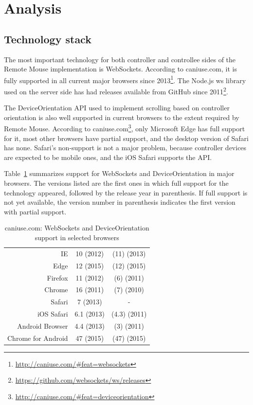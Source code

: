 \documentclass[a4paper,english,twocolumn,9pt]{extarticle}
\newcommand*\rot{\rotatebox{90}}
\begin{document}
\section{Analysis}

\subsection*{Technology stack}

The most important technology for both controller and controllee sides
of the Remote Mouse implementation is WebSockets. According to
caniuse.com, it is fully supported in all current major browsers since
2013\footnote{\url{http://caniuse.com/#feat=websockets}}. The Node.js
ws library used on the server side has had releases available from
GitHub since
2011\footnote{\url{https://github.com/websockets/ws/releases}}.

The DeviceOrientation API used to implement scrolling based on
controller orientation is also well supported in current browsers to
the extent required by Remote Mouse. According to
caniuse.com\footnote{\url{http://caniuse.com/#feat=deviceorientation}},
only Microsoft Edge has full support for it, most other browsers have
partial support, and the desktop version of Safari has none. Safari's
non-support is not a major problem, because controller devices are
expected to be mobile ones, and the iOS Safari supports the API.

Table~\ref{table:caniuse} summarizes support for WebSockets and
DeviceOrientation in major browsers. The versions listed are the first
ones in which full support for the technology appeared, followed by
the release year in parenthesis. If full support is not yet available,
the version number in parenthesis indicates the first version with
partial support.

\begin{table} \centering
  \begin{tabular}{rcc}
    & \rot{WebSockets} & \rot{Device-}\rot{Orientation} \\
    \hline
    IE & 10 (2012) & (11) (2013) \\
    Edge & 12 (2015) & (12) (2015) \\
    Firefox & 11 (2012) & (6) (2011) \\
    Chrome & 16 (2011) & (7) (2010) \\
    Safari & 7 (2013) & - \\
    iOS Safari & 6.1 (2013) & (4.3) (2011) \\
    Android Browser & 4.4 (2013) & (3) (2011) \\
    Chrome for Android & 47 (2015) & (47) (2015) \\
    \hline
  \end{tabular}
  \caption{caniuse.com: WebSockets and DeviceOrientation support in selected browsers}
  \label{table:caniuse}
\end{table}
\end{document}

